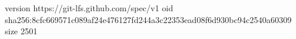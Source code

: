 version https://git-lfs.github.com/spec/v1
oid sha256:8cfc669571c089af24e476127fd244a3c22353ead08f6d930bc94c2540a60309
size 2501
